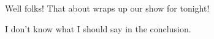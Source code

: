Well folks!  That about wraps up our show for tonight!

I don't know what I should say in the conclusion.
